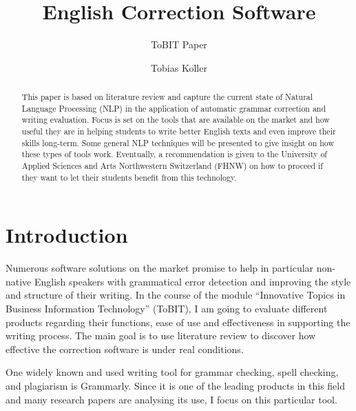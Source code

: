 \documentclass[runningheads]{llncs}
\let\OldTextregistered\textregistered
\renewcommand{\textregistered}{\OldTextregistered\xspace}
\begin{document}
\title{English Correction Software}
\subtitle{ToBIT Paper}

\author{Tobias Koller}



\maketitle              %


\begin{abstract}
This paper is based on literature review and capture the current state of Natural Language Processing (NLP) in the application of automatic grammar correction and writing evaluation. Focus is set on the tools that are available on the market and how useful they are in helping students to write better English texts and even improve their skills long-term. Some general NLP techniques will be presented to give insight on how these types of tools work. Eventually, a recommendation is given to the University of Applied Sciences and Arts Northwestern Switzerland (FHNW) on how to proceed if they want to let their students benefit from this technology.

\end{abstract}



\section{Introduction}
Numerous software solutions on the market promise to help in particular non-native English speakers with grammatical error detection and improving the style and structure of their writing. In the course of the module ``Innovative Topics in Business Information Technology'' (ToBIT), I am going to evaluate different products regarding their functions, ease of use and effectiveness in supporting the writing process. The main goal is to use literature review to discover how effective the correction software is under real conditions.

One widely known and used writing tool for grammar checking, spell checking, and plagiarism is Grammarly\textregistered. Since it is one of the leading products in this field and many research papers are analysing its use, I focus on this particular tool.
\end{document}

